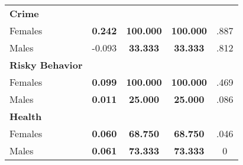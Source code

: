 \begin{tabular}{l c c c c}
\midrule
\textbf{Crime} & & & & \\
\quad Females &  \textbf{    0.242} & \textbf{  100.000} & \textbf{  100.000} & .887 \\
\quad Males &     -0.093 & \textbf{   33.333} & \textbf{   33.333} & .812 \\
\midrule
\textbf{Risky Behavior} & & & & \\
\quad Females &  \textbf{    0.099} & \textbf{  100.000} & \textbf{  100.000} & .469 \\
\quad Males &  \textbf{    0.011} & \textbf{   25.000} & \textbf{   25.000} & .086 \\
\midrule
\textbf{Health} & & & & \\
\quad Females &  \textbf{    0.060} & \textbf{   68.750} & \textbf{   68.750} & .046 \\
\quad Males &  \textbf{    0.061} & \textbf{   73.333} & \textbf{   73.333} & 0 \\
\bottomrule
\end{tabular}
